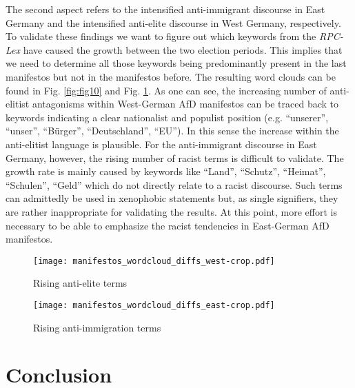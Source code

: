 \documentclass[a4paper]{scrreprt}
\begin{document}
The second aspect refers to the intensified anti-immigrant discourse in East Germany and the intensified anti-elite discourse in West Germany, respectively. To validate these findings we want to figure out which keywords from the {\em RPC-Lex} have caused the growth between the two election periods. This implies that we need to determine all those keywords being predominantly present in the last manifestos but not in the manifestos before. The resulting word clouds can be found in Fig. \ref{fig:fig10} and Fig. \ref{fig:fig11}. As one can see, the increasing number of anti-elitist antagonisms within West-German AfD manifestos can be traced back to keywords indicating a clear nationalist and populist position (e.g. ``unserer'', ``unser'', ``Bürger'', ``Deutschland'', ``EU''). In this sense the increase within the anti-elitist language is plausible. For the anti-immigrant discourse in East Germany, however, the rising number of racist terms is difficult to validate. The growth rate is mainly caused by keywords like ``Land'', ``Schutz'', ``Heimat'', ``Schulen'', ``Geld'' which do not directly relate to a racist discourse. Such terms can admittedly be used in xenophobic statements but, as single signifiers, they are rather inappropriate for validating the results. At this point, more effort is necessary to be able to emphasize the racist tendencies in East-German AfD manifestos. 
\begin{figure}
    \centering
    \begin{minipage}{.5\textwidth}
        \centering
        \texttt{[image: manifestos\_wordcloud\_diffs\_west-crop.pdf]}
        \caption{Rising anti-elite terms}
        \label{fig:fig10}
    \end{minipage}%
    \begin{minipage}{.5\textwidth}
        \centering
        \texttt{[image: manifestos\_wordcloud\_diffs\_east-crop.pdf]}
        \caption{Rising anti-immigration terms}
        \label{fig:fig11}
    \end{minipage}
\end{figure}
\chapter{Conclusion}
\end{document}
